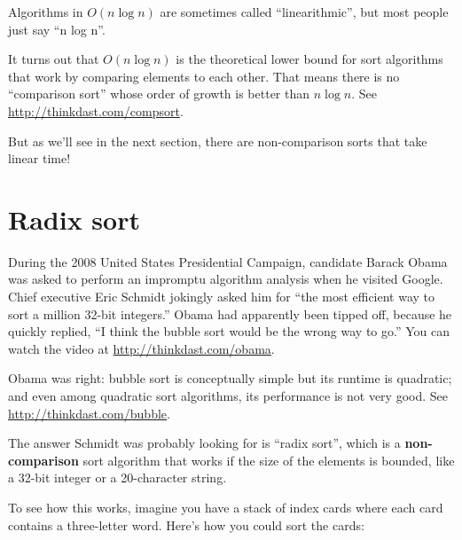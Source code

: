 \documentclass[12pt]{book}
\theoremstyle{exercise}
\begin{document}

Algorithms in $O(n \log n)$ are sometimes called
``linearithmic'', but most people just say ``n log n''.


It turns out that $O(n \log n)$ is the theoretical lower bound for
sort algorithms that work by comparing elements to each other. That
means there is no ``comparison sort'' whose order of growth is better
than $n \log n$.  See \url{http://thinkdast.com/compsort}.

But as we'll see in the next section, there are non-comparison sorts
that take linear time!



\section{Radix sort}
\label{radix-sort}


During the 2008 United States Presidential Campaign, candidate Barack
Obama was asked to perform an impromptu algorithm analysis when he
visited Google. Chief executive Eric Schmidt jokingly asked him for
``the most efficient way to sort a million 32-bit integers.'' Obama
had apparently been tipped off, because he quickly replied, ``I think
the bubble sort would be the wrong way to go.'' You can watch the
video at \url{http://thinkdast.com/obama}.

Obama was right: bubble sort is conceptually simple but its runtime is
quadratic; and even among quadratic sort algorithms, its performance
is not very good.  See \url{http://thinkdast.com/bubble}.


The answer Schmidt was probably looking for is ``radix sort'', which is
a {\bf non-comparison} sort algorithm that works if the size of the
elements is bounded, like a 32-bit integer or a 20-character string.


To see how this works, imagine you have a stack of index cards where
each card contains a three-letter word. Here's how you could sort the
cards:
\end{document}

